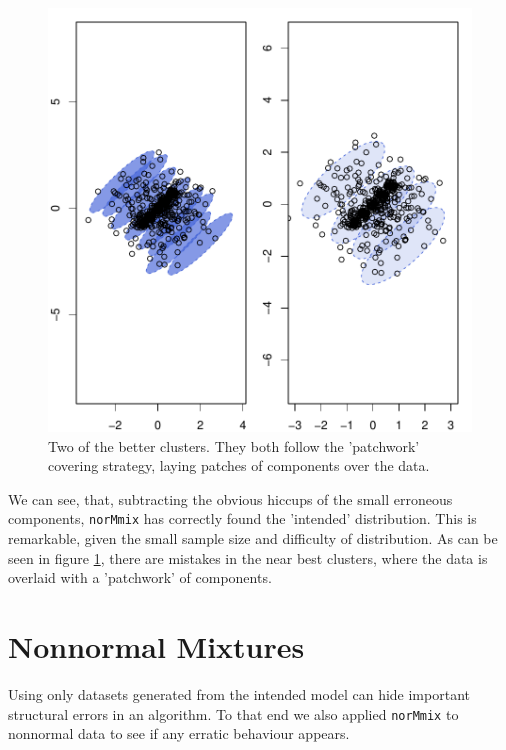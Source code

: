 \begin{figure}[h]
    \begin{Rgraph}[0.9]
\includegraphics{chapter3-fig214fit2}
    \end{Rgraph}
    \caption{Two of the better clusters. They both follow the 'patchwork'
             covering strategy, laying patches of components over the data.}
    \label{fig:214fit2}
\end{figure}

We can see, that, subtracting the obvious hiccups of the small erroneous
components, {\tt norMmix} has correctly found the 'intended' 
distribution. This is remarkable, given the small sample size and difficulty of 
distribution. As can be seen in figure \ref{fig:214fit2}, there are mistakes in
the near best clusters, where the data is overlaid with a 'patchwork' of 
components.

\clearpage

\section{Nonnormal Mixtures}

Using only datasets generated from the intended model can hide important 
structural errors in an algorithm. To that end we also applied {\tt norMmix}
to nonnormal data to see if any erratic behaviour appears.

